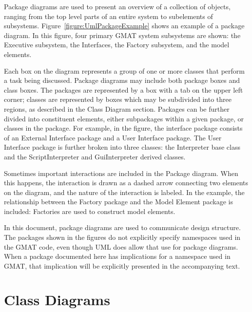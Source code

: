 Package diagrams are used to present an overview of a collection of objects, ranging from the top
level parts of an entire system to subelements of subsystems.  Figure~\ref{figure:UmlPackageExample}
shows an example of a
package diagram.  In this figure, four primary GMAT system subsystems are shown: the Executive
subsystem, the Interfaces, the Factory subsystem, and the model elements.

Each box on the diagram represents a group of one or more classes that perform a task being
discussed.  Package diagrams may include both package boxes and class boxes.  The packages are
represented by a box with a tab on the upper left corner; classes are represented by boxes which may
be subdivided into three regions, as described in the Class Diagram section.  Packages can be
further divided into constituent elements, either subpackages within a given package, or classes in
the package.  For example, in the figure, the interface package consists of an External Interface
package and a User Interface package.  The User Interface package is further broken into three
classes: the Interpreter base class and the ScriptInterpreter and GuiInterpreter derived classes.

Sometimes important interactions are included in the Package diagram.  When this happens, the
interaction is drawn as a dashed arrow connecting two elements on the diagram, and the nature of the
interaction is labeled.  In the example, the relationship between the Factory package and the Model
Element package is included: Factories are used to construct model elements.

In this document, package diagrams are used to communicate design structure.  The packages shown in
the figures do not explicitly specify namespaces used in the GMAT code, even though UML does allow
that use for package diagrams.  When a package documented here has implications for a namespace used
in GMAT, that implication will be explicitly presented in the accompanying text.

\section{Class Diagrams}

